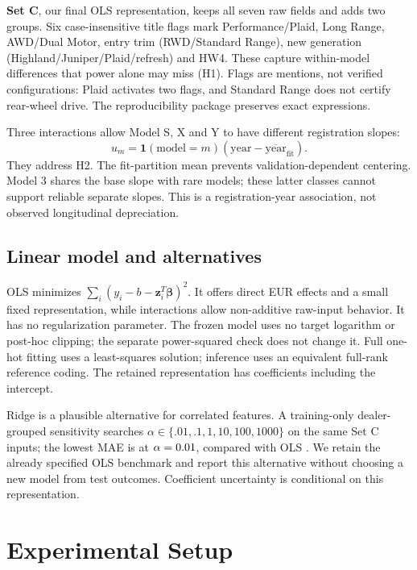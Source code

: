 \textbf{Set C}, our final OLS representation, keeps all seven raw fields and adds two groups. Six case-insensitive title flags mark Performance/Plaid, Long Range, AWD/Dual Motor, entry trim (RWD/Standard Range), new generation (Highland/Juniper/Plaid/refresh) and HW4. These capture within-model differences that power alone may miss (H1). Flags are mentions, not verified configurations: Plaid activates two flags, and Standard Range does not certify rear-wheel drive. The reproducibility package preserves exact expressions.

Three interactions allow Model S, X and Y to have different registration slopes:
\begin{equation}
u_m=\mathbf{1}(\mathrm{model}=m)(\mathrm{year}-\overline{\mathrm{year}}_{\mathrm{fit}}).
\end{equation}
They address H2. The fit-partition mean prevents validation-dependent centering. Model 3 shares the base slope with rare models; these latter classes cannot support reliable separate slopes. This is a registration-year association, not observed longitudinal depreciation.

\subsection{Linear model and alternatives}
OLS minimizes $\sum_i(y_i-b-\mathbf z_i^T\boldsymbol\beta)^2$. It offers direct EUR effects and a small fixed representation, while interactions allow non-additive raw-input behavior. It has no regularization parameter. The frozen model uses no target logarithm or post-hoc clipping; the separate power-squared check does not change it. Full one-hot fitting uses a least-squares solution; inference uses an equivalent full-rank reference coding. The retained representation has \NumParameters{} coefficients including the intercept.

Ridge is a plausible alternative for correlated features. A training-only dealer-grouped sensitivity searches $\alpha\in\{.01,.1,1,10,100,1000\}$ on the same Set C inputs; the lowest MAE is \eur\RidgeBest{} at $\alpha=0.01{}$, compared with OLS \eur\GroupC{}. We retain the already specified OLS benchmark and report this alternative without choosing a new model from test outcomes. Coefficient uncertainty is conditional on this representation.

\section{Experimental Setup}
